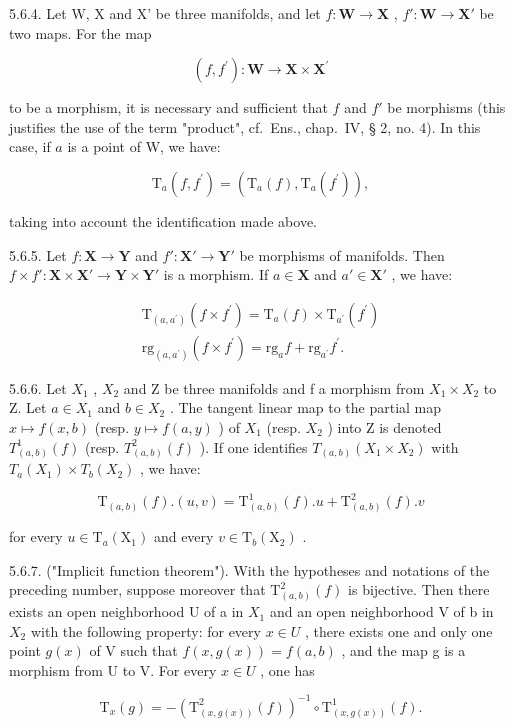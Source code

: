 5.6.4. Let W, X and X' be three manifolds, and let \(f: \mathbf{W} \to \mathbf{X}\) , \(f': \mathbf{W} \to \mathbf{X'}\) be two maps. For the map

\[
(f, f ^ {\prime}): \mathbf {W} \rightarrow \mathbf {X} \times \mathbf {X} ^ {\prime}
\]

to be a morphism, it is necessary and sufficient that \(f\) and \(f'\) be morphisms (this justifies the use of the term "product", cf.~Ens., chap.~IV, § 2, no. 4). In this case, if \(a\) is a point of W, we have:

\[
\mathrm{T} _ {a} (f, f ^ {\prime}) = (\mathrm{T} _ {a} (f), \mathrm{T} _ {a} (f ^ {\prime})),
\]

taking into account the identification made above.

5.6.5. Let \(f: \mathbf{X} \to \mathbf{Y}\) and \(f': \mathbf{X}' \to \mathbf{Y}'\) be morphisms of manifolds. Then \(f \times f': \mathbf{X} \times \mathbf{X}' \to \mathbf{Y} \times \mathbf{Y}'\) is a morphism. If \(a \in \mathbf{X}\) and \(a' \in \mathbf{X}'\) , we have:

\[
\begin{array}{l} \mathrm{T} _ {(a, a ^ {\prime})} (f \times f ^ {\prime}) = \mathrm{T} _ {a} (f) \times \mathrm{T} _ {a ^ {\prime}} (f ^ {\prime}) \\ \mathrm{rg} _ {(a, a ^ {\prime})} (f \times f ^ {\prime}) = \mathrm{rg} _ {a} f + \mathrm{rg} _ {a ^ {\prime}} f ^ {\prime}. \end{array}
\]

5.6.6. Let \(X_{1}\) , \(X_{2}\) and Z be three manifolds and f a morphism from \(X_{1} \times X_{2}\) to Z. Let \(a \in X_{1}\) and \(b \in X_{2}\) . The tangent linear map to the partial map \(x \mapsto f(x, b)\) (resp. \(y \mapsto f(a, y)\) ) of \(X_{1}\) (resp. \(X_{2}\) ) into Z is denoted \(T_{(a,b)}^{1}(f)\) (resp. \(T_{(a,b)}^{2}(f)\) ). If one identifies \(T_{(a,b)}(X_{1} \times X_{2})\) with \(T_{a}(X_{1}) \times T_{b}(X_{2})\) , we have:

\[
\mathrm{T} _ {(a, b)} (f). (u, v) = \mathrm{T} _ {(a, b)} ^ {1} (f). u + \mathrm{T} _ {(a, b)} ^ {2} (f). v
\]

for every \(u \in \mathrm{T}_a(\mathrm{X}_1)\) and every \(v \in \mathrm{T}_b(\mathrm{X}_2)\) .

5.6.7. ("Implicit function theorem"). With the hypotheses and notations of the preceding number, suppose moreover that \(\mathrm{T}_{(a,b)}^{2}(f)\) is bijective. Then there exists an open neighborhood U of a in \(X_{1}\) and an open neighborhood V of b in \(X_{2}\) with the following property: for every \(x \in U\) , there exists one and only one point \(g(x)\) of V such that \(f(x, g(x)) = f(a, b)\) , and the map g is a morphism from U to V. For every \(x \in U\) , one has

\[
\mathrm{T} _ {x} (g) = - \left(\mathrm{T} _ {(x, g (x))} ^ {2} (f)\right) ^ {- 1} \circ \mathrm{T} _ {(x, g (x))} ^ {1} (f).
\]

